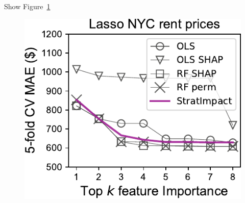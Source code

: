 \documentclass[11pt]{article}
\newcommand{\figref}[1]{Figure~\ref{#1}}
\begin{document}
Show \figref{fig:lasso}

\begin{figure}[htbp]
\begin{center}
\includegraphics[scale=0.5]{images/rent-topk-Lasso-Importance.pdf}
\label{fig:lasso}
\end{center}
\end{figure}
\end{document}
